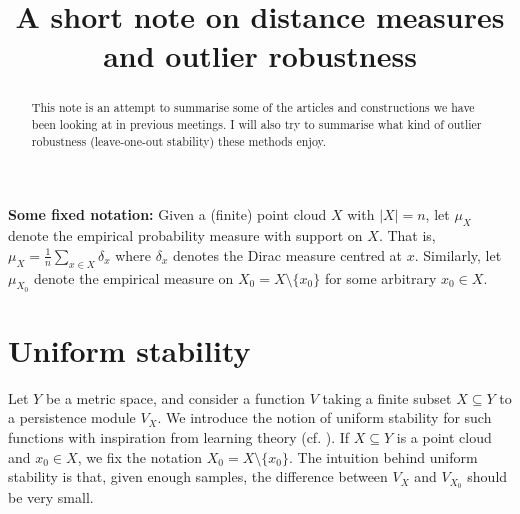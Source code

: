 \documentclass[10pt,a4paper]{article}
\title{A short note on distance measures and outlier robustness}
\theoremstyle{definition}
\newcommand{\R}{\mathbb{R}}
\begin{document}
\maketitle


\begin{abstract}
	This note is an attempt to summarise some of the articles and constructions we have been looking at in previous meetings. I will also try to summarise what kind of outlier robustness (leave-one-out stability) these methods enjoy.
\end{abstract}

\textbf{Some fixed notation:} Given a (finite) point cloud $X$ with $|X|=n$, let $\mu_X$ denote the empirical probability measure with support on $X$. That is, $\mu_X = \frac{1}{n}\sum_{x\in X}\delta_x$ where $\delta_x$ denotes the Dirac measure centred at $x$. Similarly, let $\mu_{X_0}$ denote the empirical measure on $X_0 = X\setminus\{x_0\}$ for some arbitrary $x_0\in X$. 


\section{Uniform stability}
Let $Y$ be a metric space, and consider a function $V$ taking a finite subset $X\subseteq Y$ to a persistence module $V_X$. We introduce the notion of uniform stability for such functions with inspiration from learning theory (cf. \cite{bousquet2002stability}). If $X\subseteq Y$ is a point cloud and $x_0\in X$, we fix the notation $X_0 = X\setminus\{x_0\}$. The intuition behind uniform stability is that, given enough samples, the difference between $V_X$ and $V_{X_0}$ should be very small.
\end{document}
